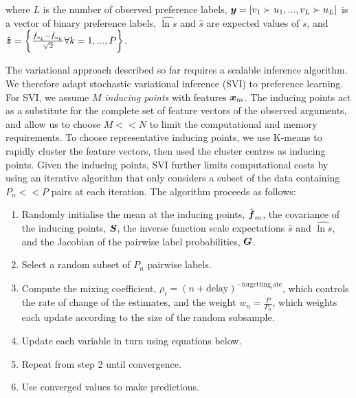 where $L$ is the number of observed preference labels, 
$\boldsymbol y = \left[v_1 \succ u_1, ..., v_L \succ u_L\right]$ is a vector of binary preference labels,
$\hat{\ln s}$ and $\hat s$ are expected values of $s$,
and $\hat{\boldsymbol z} = \left\{ \frac{\hat{f}_{v_k} - \hat{f}_{u_k}}{\sqrt 2} \forall k=1,...,P\right\}$.

The variational approach described so far requires a scalable inference algorithm.
We therefore adapt stochastic variational inference (SVI) 
\cite{hensman2013gaussian,hensman_scalable_2015} to preference learning.
For SVI, we assume $M$ \emph{inducing points} with features $\boldsymbol x_m$. 
The inducing points act as a substitute for the complete set of feature vectors of the observed arguments,
and allow us to choose $M << N$ to limit the computational
and memory requirements. 
To choose representative inducing points, we use K-means to rapidly cluster the feature vectors, 
then used the cluster centres as inducing points.
Given the inducing points, SVI further limits computational costs by using an iterative algorithm 
that only considers a subset of the data containing $P_n << P$ pairs at each iteration. 
The algorithm proceeds as follows:
\begin{enumerate}
\item Randomly initialise the mean at the 
inducing points, $\hat{\boldsymbol f}_{m}$, the covariance of the inducing points, $\boldsymbol S$, 
 the inverse function scale expectations $\hat{s}$ and $\hat{\ln s}$,
 and the Jacobian of the pairwise label probabilities, $\boldsymbol G$.
\item Select a random subset of $P_n$ pairwise labels.
\item Compute the mixing coefficient, $\rho_i=(n + \mathrm{delay})^{-\mathrm{forgetting_rate}}$, which controls the 
rate of change of the estimates, and the weight $w_n = \frac{P}{P_n}$, which weights each update
 according to the size of the random subsample.
\item Update each variable in turn using equations below.
\item Repeat from step 2 until convergence.
\item Use converged values to make predictions.
\end{enumerate}

